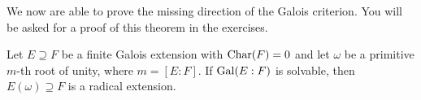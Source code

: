 We now are able to prove the missing direction of the Galois criterion. You will be asked for a proof of this theorem in the exercises.

\begin{theorem}
  \label{thr:34}
  Let $E ⊇F$ be a finite Galois extension with $\mathrm{Char}(F) = 0$ and let $ω$ be a primitive $m$-th root of unity, where $m = [E:F]$. If $\operatorname{Gal}(E:F)$ is solvable, then $E(ω) ⊇ F$ is a radical extension. 
\end{theorem}



